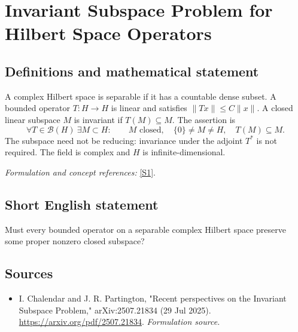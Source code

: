 \documentclass[11pt]{article}
\begin{document}
\section*{\texorpdfstring{Invariant Subspace Problem for Hilbert Space Operators}{Invariant Subspace Problem for Hilbert Space Operators}}\label{108}
\subsection{Definitions and mathematical statement}
A complex Hilbert space is separable if it has a countable dense subset. A bounded operator $T:H\to H$ is linear and satisfies $\|Tx\|\le C\|x\|$. A closed linear subspace $M$ is invariant if $T(M)\subseteq M$. The assertion is
\[
 \forall T\in\mathcal B(H)\ \exists M\subset H:\qquad
 M\text{ closed},\quad\{0\}\ne M\ne H,\quad T(M)\subseteq M.
\]
The subspace need not be reducing: invariance under the adjoint $T^*$ is not required. The field is complex and $H$ is infinite-dimensional.
\par\smallskip\textit{Formulation and concept references:} \href{https://arxiv.org/pdf/2507.21834}{[S1]}.

\subsection{Short English statement}
Must every bounded operator on a separable complex Hilbert space preserve some proper nonzero closed subspace?
\subsection{Sources}
\begin{itemize}
\item[S1]I. Chalendar and J. R. Partington, "Recent perspectives on the Invariant Subspace Problem," arXiv:2507.21834 (29 Jul 2025).
\url{https://arxiv.org/pdf/2507.21834}.
\textit{Formulation source.}
\end{itemize}
\end{document}
